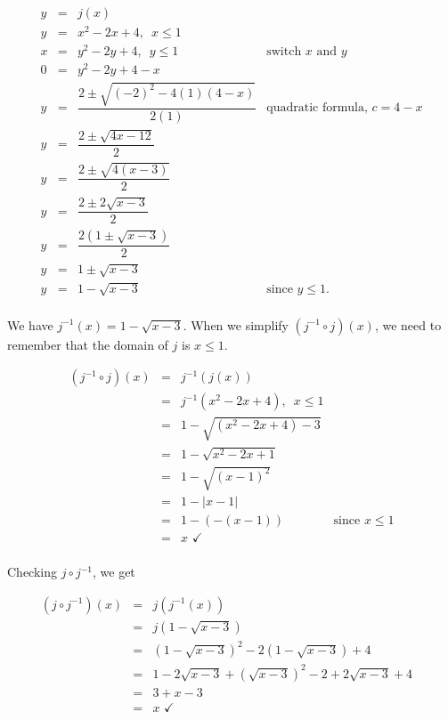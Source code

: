 \begin{ex}
\begin{enumerate}
\[ \begin{array}{rclr}
y & = & j(x) & \\
y & = & x^2-2x+4, \, \, \, x \leq 1 \\
x & = & y^2 - 2y+4, \, \, \, y \leq 1 & \mbox{switch $x$ and $y$} \\
0 & = & y^2 - 2y + 4-x & \\
y & = & \dfrac{2 \pm \sqrt{(-2)^2-4(1)(4-x)}}{2(1)} & \mbox{quadratic formula, $c=4-x$} \\ [10pt]
y & = & \dfrac{2 \pm \sqrt{4x-12}}{2} & \\ [6pt]
y & = & \dfrac{2 \pm \sqrt{4(x-3)}}{2} & \\ [6pt]
y & = & \dfrac{2 \pm 2\sqrt{x-3}}{2} & \\ [6pt]
y & = & \dfrac{2\left(1 \pm \sqrt{x-3}\right)}{2} & \\ [6pt]
y & = & 1 \pm \sqrt{x-3} & \\
y & = & 1 - \sqrt{x-3} & \mbox{since $y \leq 1$.} \\
\end{array}\]

We have $j^{-1}(x) = 1 - \sqrt{x-3}$.  When we simplify $\left(j^{-1} \circ j\right)(x)$, we need to remember that  the domain of $j$ is $x \leq 1$.

\[ \begin{array}{rclr}

\left(j^{-1} \circ j \right)(x) & = & j^{-1}(j(x)) & \\ 

& = & j^{-1}\left(x^2-2x+4\right), \, \, \, x \leq 1 & \\
& = & 1 - \sqrt{\left(x^2-2x+4\right)-3} & \\
& = & 1 - \sqrt{x^2-2x+1} & \\
& = & 1 - \sqrt{(x-1)^2} & \\
& = & 1 - |x-1|& \\
& = & 1 - (-(x-1)) & \mbox{since $x \leq 1$}\\
& = & x \, \, \checkmark &\\
\end{array}\]

Checking $j \circ j^{-1}$, we get

\[ \begin{array}{rclr}

\left(j \circ j^{-1} \right)(x) & = & j\left(j^{-1}(x)\right) & \\ 

& = & j\left(1 - \sqrt{x-3}\right) & \\
& = & \left(1 - \sqrt{x-3}\right)^2-2\left(1 - \sqrt{x-3}\right)+4 & \\
& = & 1 - 2\sqrt{x-3} + \left(\sqrt{x-3}\right)^2 -2 + 2\sqrt{x-3}+4 & \\
& = & 3+ x-3 & \\
& = &  x \, \, \checkmark &\\
\end{array}\]


\end{enumerate}
\end{ex}

